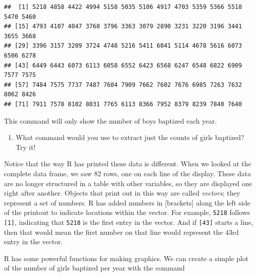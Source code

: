 \documentclass[]{article}
\newenvironment{Shaded}{\begin{snugshade}}{\end{snugshade}}
\newcommand{\KeywordTok}[1]{\textcolor[rgb]{0.13,0.29,0.53}{\textbf{#1}}}
\newcommand{\DataTypeTok}[1]{\textcolor[rgb]{0.13,0.29,0.53}{#1}}
\newcommand{\OperatorTok}[1]{\textcolor[rgb]{0.81,0.36,0.00}{\textbf{#1}}}
\newcommand{\NormalTok}[1]{#1}
\providecommand{\tightlist}{%
  \setlength{\itemsep}{0pt}\setlength{\parskip}{0pt}}
\begin{document}
\begin{Shaded}
\end{Shaded}

\begin{verbatim}
##  [1] 5218 4858 4422 4994 5158 5035 5106 4917 4703 5359 5366 5518 5470 5460
## [15] 4793 4107 4047 3768 3796 3363 3079 2890 3231 3220 3196 3441 3655 3668
## [29] 3396 3157 3209 3724 4748 5216 5411 6041 5114 4678 5616 6073 6506 6278
## [43] 6449 6443 6073 6113 6058 6552 6423 6568 6247 6548 6822 6909 7577 7575
## [57] 7484 7575 7737 7487 7604 7909 7662 7602 7676 6985 7263 7632 8062 8426
## [71] 7911 7578 8102 8031 7765 6113 8366 7952 8379 8239 7840 7640
\end{verbatim}

This command will only show the number of boys baptized each year.

\begin{enumerate}
\def\labelenumi{\arabic{enumi}.}
\tightlist
\item
  What command would you use to extract just the counts of girls
  baptized? Try it!
\end{enumerate}

Notice that the way R has printed these data is different. When we
looked at the complete data frame, we saw 82 rows, one on each line of
the display. These data are no longer structured in a table with other
variables, so they are displayed one right after another. Objects that
print out in this way are called \emph{vectors}; they represent a set of
numbers. R has added numbers in {[}brackets{]} along the left side of
the printout to indicate locations within the vector. For example,
\texttt{5218} follows \texttt{{[}1{]}}, indicating that \texttt{5218} is
the first entry in the vector. And if \texttt{{[}43{]}} starts a line,
then that would mean the first number on that line would represent the
43rd entry in the vector.

R has some powerful functions for making graphics. We can create a
simple plot of the number of girls baptized per year with the command

\begin{Shaded}
\end{Shaded}
\end{document}
